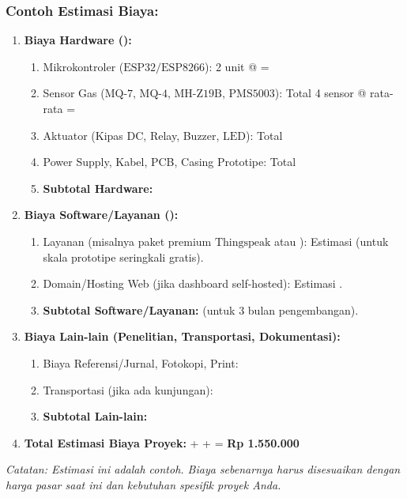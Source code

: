 \documentclass{elsinta}
\begin{document}
\subsubsection*{Contoh Estimasi Biaya:}
\begin{enumerate}
    \item \textbf{Biaya Hardware ():}
    \begin{enumerate}
        \item Mikrokontroler ($\text{ESP32/ESP8266}$): 2 unit @  = 
        \item Sensor Gas ($\text{MQ-7, MQ-4, MH-Z19B, PMS5003}$): Total 4 sensor @ rata-rata  = 
        \item Aktuator (Kipas $\text{DC}$, Relay, Buzzer, $\text{LED}$): Total 
        \item Power Supply, Kabel, PCB, Casing Prototipe: Total 
        \item \textbf{Subtotal Hardware:} 
    \end{enumerate}
    \item \textbf{Biaya Software/Layanan ():}
    \begin{enumerate}
        \item Layanan  (misalnya paket premium $\text{Thingspeak}$ atau ): Estimasi  (untuk skala prototipe seringkali gratis).
        \item Domain/Hosting Web (jika dashboard self-hosted): Estimasi .
        \item \textbf{Subtotal Software/Layanan:}  (untuk 3 bulan pengembangan).
    \end{enumerate}
    \item \textbf{Biaya Lain-lain (Penelitian, Transportasi, Dokumentasi):}
    \begin{enumerate}
        \item Biaya Referensi/Jurnal, Fotokopi, Print: 
        \item Transportasi (jika ada kunjungan): 
        \item \textbf{Subtotal Lain-lain:} 
    \end{enumerate}
    \item \textbf{Total Estimasi Biaya Proyek:}  +  +  = \textbf{Rp 1.550.000}
\end{enumerate}
\textit{Catatan: Estimasi ini adalah contoh. Biaya sebenarnya harus disesuaikan dengan harga pasar saat ini dan kebutuhan spesifik proyek Anda.}
\end{document}
